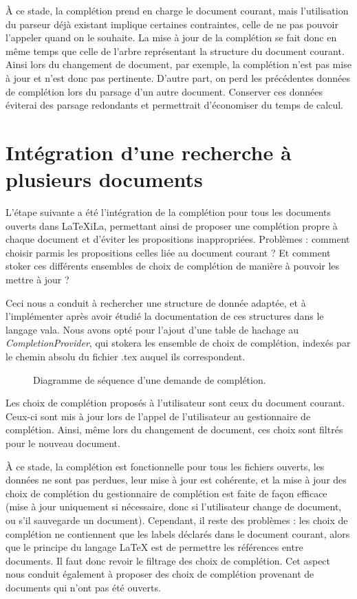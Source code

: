 \documentclass[a4paper,11pt]{report}
\begin{document}
À ce stade, la complétion prend en charge le document courant, mais l'utilisation du parseur déjà existant implique certaines contraintes, celle de ne pas pouvoir l'appeler quand on le souhaite.
La mise à jour de la complétion se fait donc en même temps que celle de l'arbre représentant la structure du document courant. 
Ainsi lors du changement de document, par exemple, la complétion n'est pas mise à jour et n'est donc pas pertinente.
D'autre part, on perd les précédentes données de complétion lors du parsage d'un autre document.
Conserver ces données éviterai des parsage redondants et permettrait d'économiser du temps de calcul.

\section{Intégration d'une recherche à plusieurs documents}
L'étape suivante a été l'intégration de la complétion pour tous les documents ouverts dans LaTeXiLa, permettant ainsi de proposer une complétion propre à chaque document et d'éviter les propositions inappropriées.
Problèmes : comment choisir parmis les propositions celles liée au document courant ? Et comment stoker ces différents ensembles de choix de complétion de manière à pouvoir les mettre à jour ?

Ceci nous a conduit à rechercher une structure de donnée adaptée, et à l'implémenter après avoir étudié la documentation de ces structures dans le langage vala.
Nous avons opté pour l'ajout d'une table de hachage au \textit{CompletionProvider}, qui stokera les ensemble de choix de complétion, indexés par le chemin absolu du fichier .tex auquel ils correspondent.

\begin{figure}[h]
\label{fig:filtering_completion}
\centering

\caption{Diagramme de séquence d'une demande de complétion.}
\end{figure}

Les choix de complétion proposés à l'utilisateur sont ceux du document courant.
Ceux-ci sont mis à jour lors de l'appel de l'utilisateur au gestionnaire de complétion. Ainsi, même lors du changement de document, ces choix sont filtrés pour le nouveau document.

À ce stade, la complétion est fonctionnelle pour tous les fichiers ouverts, les données ne sont pas perdues, leur mise à jour est cohérente, et la mise à jour des choix de complétion du gestionnaire de complétion est faite de façon efficace (mise à jour uniquement si nécessaire, donc si l'utilisateur change de document, ou s'il sauvegarde un document).
Cependant, il reste des problèmes : les choix de complétion ne contiennent que les labels déclarés dans le document courant, alors que le principe du langage \LaTeX{} est de permettre les références entre documents.
Il faut donc revoir le filtrage des choix de complétion.
Cet aspect nous conduit également à proposer des choix de complétion provenant de documents qui n'ont pas été ouverts.
\end{document}

